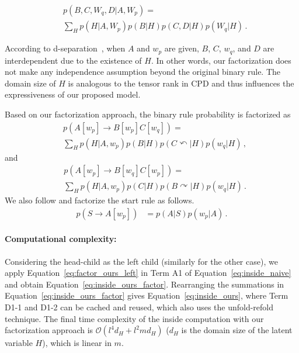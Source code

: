 \documentclass[11pt,a4paper]{article}
\begin{document}
\begin{align}
&p(B, C, W_q, D | A, W_p) =  \\
&\sum_{H} p(H| A, W_p) p(B | H) p(C, D| H) p(W_q| H)\,.\nonumber
\end{align}






According to d-separation~\citep{dseparation}, 
when $A$ and $w_p$ are given, $B$, $C$, $w_q$, and $D$ are interdependent due to the existence of $H$.
In other words, our factorization does not make any independence assumption beyond the original binary rule.  The domain size of $H$ is analogous to the tensor rank in CPD and thus influences the expressiveness of our proposed model. 


Based on our factorization approach, the binary rule probability is factorized as
\begin{align}
\label{eq:factor_ours_left}
    \!\!\!&p(A[w_p]\rightarrow B[w_p] C[w_q]) = \\ \nonumber
&\sum_{H} p(H| A, w_p)p(B|H)p(C\curvearrowleft|H)p(w_q|H) \,,
\end{align}
and 
\begin{align}
\label{eq:factor_ours_right}
\!\!\!&p(A[w_p] \rightarrow B[w_q] C[w_p]) = \\\nonumber
&\sum_{H} p(H | A, w_p)p(C|H)p(B \curvearrowright|H)p(w_q|H)\,.
\end{align}
We also follow \citet{zhu-etal-2020-return} and factorize the start rule as follows.
\begin{align}\label{eq:factor_zhu_root}
p(S\rightarrow A[w_p]) 
&=p(A | S)p(w_p | A)\,.
\end{align}


\paragraph{Computational complexity:} Considering the head-child as the left child (similarly for the other case),
we apply Equation~\ref{eq:factor_ours_left} in Term A1 of Equation~\ref{eq:inside_naive} and obtain Equation~\ref{eq:inside_ours_factor}.
Rearranging the summations in Equation~\ref{eq:inside_ours_factor} gives Equation~\ref{eq:inside_ours},
where Term D1-1 and D1-2 can be cached and reused, which also uses the  unfold-refold technique. 
The final time complexity of the inside computation with our factorization approach is $\mathcal{O}(l^4d_H + l^2md_H)$ ($d_H$ is the domain size of the latent variable $H$), which is linear in $m$.
\end{document}
